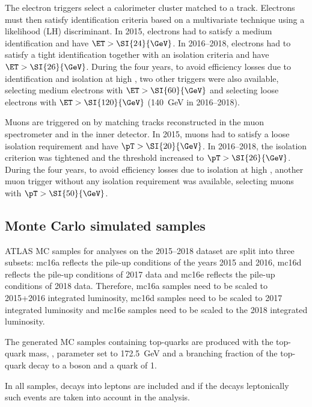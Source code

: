 The electron triggers select a calorimeter cluster matched to a track.
Electrons must then satisfy identification criteria based on a multivariate technique using a likelihood (LH) discriminant.
In 2015, electrons had to satisfy a medium identification and have $\ET > \SI{24}{\GeV}$.
In 2016--2018, electrons had to satisfy a tight identification
together with an isolation criteria and have $\ET > \SI{26}{\GeV}$.
During the four years, to avoid efficiency losses due to identification and isolation at high \pT, 
two other triggers were also available,
selecting medium electrons with $\ET > \SI{60}{\GeV}$
and selecting loose electrons with $\ET > \SI{120}{\GeV}$ (\SI{140}{\GeV} in 2016--2018).

Muons are triggered on by matching tracks reconstructed in the muon spectrometer and in the inner detector.
In 2015, muons had to satisfy a loose isolation requirement and have $\pT >\SI{20}{\GeV}$. In 2016--2018, the isolation criterion was tightened and the threshold increased to $\pT >\SI{26}{\GeV}$.
During the four years, to avoid efficiency losses due to isolation at high \pT,
another muon trigger without any isolation requirement was available,
selecting muons with $\pT > \SI{50}{\GeV}$. 

\subsection{Monte Carlo simulated samples}%
\label{sec:samples:mc}

ATLAS MC samples for analyses on the 2015--2018 dataset are split into three subsets: mc16a reflects the pile-up conditions of the years 2015 and 2016, mc16d reflects the pile-up conditions of 2017 data and mc16e reflects the pile-up conditions of 2018 data. Therefore, mc16a samples need to be scaled to 2015+2016 integrated luminosity, mc16d samples need to be scaled to 2017 integrated luminosity and mc16e samples need to be scaled to the 2018 integrated luminosity.

The generated MC samples containing top-quarks are produced with the top-quark mass, \mtop,
parameter set to \SI{172.5}{\GeV} and a branching fraction of the top-quark decay to a \PW boson and a \Pqb quark of 1. 

In all samples, decays into \Pgt leptons are included and if the \Pgt decays leptonically such events are taken into account in the analysis.


